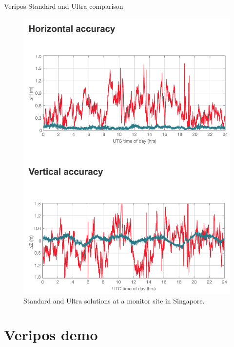 \documentclass[11pt]{beamer}
\begin{document}
\begin{frame}{Veripos Standard and Ultra comparison}
		\begin{figure}[T]
			\vspace*{-1cm}
			\includegraphics[height=.85\textheight]{pic/Ultra.png}
			\caption{Standard and Ultra solutions at a monitor site in Singapore.}
		\end{figure}
\end{frame}

\section{Veripos demo}



\end{document}
